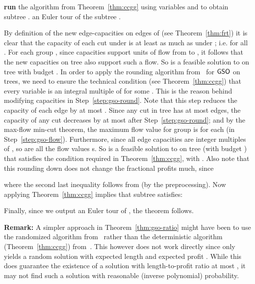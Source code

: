 \documentclass[11pt]{article}
\def\gso{\ensuremath{{\sf GSO}}\xspace}
\newenvironment{pf}{

\noindent{\bf Proof:}} {\hfill


}
\begin{document}
\begin{pf}
\begin{algorithm}[!h]
\begin{algorithmic}[1]
    \STATE \label{step:gso-density} {\bf run} the algorithm from Theorem~\ref{thm:ccgg} using variables  and  to obtain subtree . 
     an Euler tour  of the subtree .
  \end{algorithmic}
\end{algorithm}

By definition of the new edge-capacities  on edges of  (see Theorem~\ref{thm:frt}) it is clear that the capacity of each cut under  is at least as much as under ; i.e.  for all .
For each group , since  capacities  support  units of flow from  to , it follows that the new capacities  on tree  also support such a flow. So  is a feasible solution to \lpgo on tree  with budget .  
In order to apply the rounding algorithm from~\cite{ccgg} for \gso on trees, we need to ensure the technical condition (see Theorem~\ref{thm:ccgg}) that every variable is an integral multiple of  for some . This is the reason behind modifying capacities  in Step~\ref{step:gso-round}. Note that this step reduces the capacity  of each edge  by at most   . Since any cut in tree  has at most  edges,
  the capacity of any cut decreases by at most  after
  Step~\ref{step:gso-round}; and by the max-flow min-cut theorem,
  the maximum flow value for group  is  for each  (in
  Step~\ref{step:gso-flow}). Furthermore, since all edge capacities are
  integer multiples of , so are all the flow values 
  s.  
  So  is a feasible solution to \lpgo on tree  (with budget ) that satisfies the condition required in Theorem~\ref{thm:ccgg}, with .  
Also note  that this rounding down does not change the fractional profits much,  since
  
where the second last inequality follows from  (by the preprocessing). Now applying Theorem~\ref{thm:ccgg} implies that subtree  satisfies:

Finally, since we output an Euler tour of , the theorem follows.
\end{pf}
\medskip

\noindent
{\bf Remark:} A simpler approach in Theorem~\ref{thm:gso-ratio} might have been  to use the randomized algorithm from~\cite{gkr} rather than the deterministic algorithm (Theorem~\ref{thm:ccgg}) from~\cite{ccgg}. This however does not work directly since \cite{gkr} only yields a random solution  with  expected length  and   expected profit . While this does guarantee the existence of a solution with length-to-profit ratio at most , it may not find such a solution with reasonable (inverse polynomial) probability. 
\end{document}
